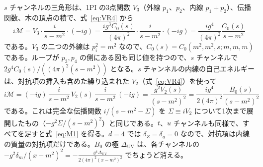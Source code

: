 \documentclass[a4paper,10pt]{ltjsarticle}
\begin{document}
$s$ チャンネルの三角形は、1PI の3点関数 $V_3$（外線 $p_1$、$p_2$、内線 $p_1+p_2$）、伝播関数、木の頂点の積で、式~\eqref{eq:VR4} から
\begin{equation*}
i\mathcal{M}=V_3\cdot\frac{i}{s-m^2}\cdot(-ig)=\frac{ig^3C_0(s)}{(4\pi)^2}\cdot\frac{i}{s-m^2}\cdot(-ig)=\frac{ig^4}{(4\pi)^2}\frac{C_0(s)}{s-m^2}
\end{equation*}
である。$V_3$ の二つの外線は $p_i^2=m^2$ なので、$C_0(s)=C_0(m^2,m^2,s;m,m,m)$ である。ループが $p_3,p_4$ の側にある図も同じ値を持つので、$s$ チャンネルで $2g^4C_0(s)/((4\pi)^2(s-m^2))$ となる。$s$ チャンネルの内線の自己エネルギーは、対抗項の挿入も含めた繰り込まれた $V_2$（式~\eqref{eq:VR4}）を使って
\begin{equation*}
i\mathcal{M}=(-ig)\,\frac{i}{s-m^2}\,V_2(s)\,\frac{i}{s-m^2}\,(-ig)=\frac{g^2V_2(s)}{(s-m^2)^2}=\frac{ig^4}{2(4\pi)^2}\frac{B_0(s)}{(s-m^2)^2}
\end{equation*}
である。これは完全な伝播関数 $i/(s-m^2-\Sigma)$ を $\Sigma\equiv iV_2$ について1次まで展開したもの（$-g^2\Sigma/(s-m^2)^2$）と同じである。$t$、$u$ チャンネルも同様で、すべてを足すと式~\eqref{eq:M1} を得る。$d=4$ では $\delta_Z=\delta_g=0$ なので、対抗項は内線の質量の対抗項だけである。$B_0$ の極 $\Delta_{\mathrm{UV}}$ は、各チャンネルの $-g^2\delta_m/(x-m^2)^2=-\frac{g^4\Delta_{\mathrm{UV}}}{2(4\pi)^2(x-m^2)^2}$ でちょうど消える。
\end{document}
